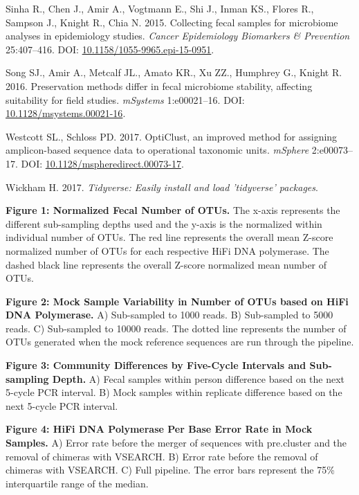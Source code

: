 \documentclass[12pt,]{article}
\begin{document}
\hypertarget{ref-preservation_Sinha_2015}{}
Sinha R., Chen J., Amir A., Vogtmann E., Shi J., Inman KS., Flores R.,
Sampson J., Knight R., Chia N. 2015. Collecting fecal samples for
microbiome analyses in epidemiology studies. \emph{Cancer Epidemiology
Biomarkers \& Prevention} 25:407--416. DOI:
\href{https://doi.org/10.1158/1055-9965.epi-15-0951}{10.1158/1055-9965.epi-15-0951}.

\hypertarget{ref-preservation_Song_2016}{}
Song SJ., Amir A., Metcalf JL., Amato KR., Xu ZZ., Humphrey G., Knight
R. 2016. Preservation methods differ in fecal microbiome stability,
affecting suitability for field studies. \emph{mSystems} 1:e00021--16.
DOI:
\href{https://doi.org/10.1128/msystems.00021-16}{10.1128/msystems.00021-16}.

\hypertarget{ref-opticlust_Westcott_2017}{}
Westcott SL., Schloss PD. 2017. OptiClust, an improved method for
assigning amplicon-based sequence data to operational taxonomic units.
\emph{mSphere} 2:e00073--17. DOI:
\href{https://doi.org/10.1128/mspheredirect.00073-17}{10.1128/mspheredirect.00073-17}.

\hypertarget{ref-tidyverse_2017}{}
Wickham H. 2017. \emph{Tidyverse: Easily install and load 'tidyverse'
packages}.

\newpage

\textbf{Figure 1: Normalized Fecal Number of OTUs.} The x-axis
represents the different sub-sampling depths used and the y-axis is the
normalized within individual number of OTUs. The red line represents the
overall mean Z-score normalized number of OTUs for each respective HiFi
DNA polymerase. The dashed black line represents the overall Z-score
normalized mean number of OTUs.

\textbf{Figure 2: Mock Sample Variability in Number of OTUs based on
HiFi DNA Polymerase.} A) Sub-sampled to 1000 reads. B) Sub-sampled to
5000 reads. C) Sub-sampled to 10000 reads. The dotted line represents
the number of OTUs generated when the mock reference sequences are run
through the pipeline.

\textbf{Figure 3: Community Differences by Five-Cycle Intervals and
Sub-sampling Depth.} A) Fecal samples within person difference based on
the next 5-cycle PCR interval. B) Mock samples within replicate
difference based on the next 5-cycle PCR interval.

\textbf{Figure 4: HiFi DNA Polymerase Per Base Error Rate in Mock
Samples.} A) Error rate before the merger of sequences with pre.cluster
and the removal of chimeras with VSEARCH. B) Error rate before the
removal of chimeras with VSEARCH. C) Full pipeline. The error bars
represent the 75\% interquartile range of the median.
\end{document}
